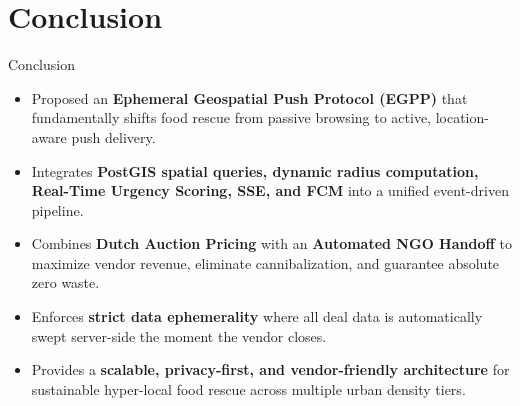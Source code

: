 \documentclass[aspectratio=169,xcolor=dvipsnames]{beamer}
\begin{document}
\section{Conclusion}
\begin{frame}{Conclusion}
\justifying
\begin{itemize}

    \item Proposed an \textbf{Ephemeral Geospatial Push Protocol (EGPP)} that fundamentally shifts food rescue from passive browsing to active, location-aware push delivery.

    \item Integrates \textbf{PostGIS spatial queries, dynamic radius computation, Real-Time Urgency Scoring, SSE, and FCM} into a unified event-driven pipeline.

    \item Combines \textbf{Dutch Auction Pricing} with an \textbf{Automated NGO Handoff} to maximize vendor revenue, eliminate cannibalization, and guarantee absolute zero waste.

    \item Enforces \textbf{strict data ephemerality} where all deal data is automatically swept server-side the moment the vendor closes.

    \item Provides a \textbf{scalable, privacy-first, and vendor-friendly architecture} for sustainable hyper-local food rescue across multiple urban density tiers.

\end{itemize}
\end{frame}

\end{document}
